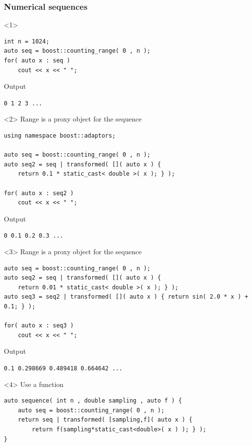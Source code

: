 \documentclass{beamer}
\newcommand{\heading}[1]{\frametitle{#1}}
\begin{document}
\begin{frame}[fragile]
 \heading{Numerical sequences}
 
 \begin{onlyenv}<1>
\begin{lstlisting}[basicstyle=\scriptsize\ttfamily]
int n = 1024;
auto seq = boost::counting_range( 0 , n );
for( auto x : seq )
    cout << x << " ";
\end{lstlisting}
\vspace{2ex}Output

\vspace{0.5ex}\lstinline$0 1 2 3 ...$
 \end{onlyenv}
  \begin{onlyenv}<2>
  Range is a proxy object for the sequence
\begin{lstlisting}[basicstyle=\scriptsize\ttfamily]
using namespace boost::adaptors;

auto seq = boost::counting_range( 0 , n );
auto seq2 = seq | transformed( []( auto x ) {
    return 0.1 * static_cast< double >( x ); } );

for( auto x : seq2 )
    cout << x << " ";
\end{lstlisting}
\vspace{2ex}Output

\vspace{0.5ex}\lstinline$0 0.1 0.2 0.3 ...$
 \end{onlyenv}
  \begin{onlyenv}<3>
  Range is a proxy object for the sequence
\begin{lstlisting}[basicstyle=\scriptsize\ttfamily]
auto seq = boost::counting_range( 0 , n );
auto seq2 = seq | transformed( []( auto x ) {
    return 0.01 * static_cast< double >( x ); } );
auto seq3 = seq2 | transformed( []( auto x ) { return sin( 2.0 * x ) + 0.1; } );

for( auto x : seq3 )
    cout << x << " ";
\end{lstlisting}
\vspace{2ex}Output

\vspace{0.5ex}\lstinline$0.1 0.298669 0.489418 0.664642 ...$
 \end{onlyenv}
  \begin{onlyenv}<4>
Use a function
\begin{lstlisting}[basicstyle=\scriptsize\ttfamily]
auto sequence( int n , double sampling , auto f ) {
    auto seq = boost::counting_range( 0 , n );
    return seq | transformed( [sampling,f]( auto x ) { 
        return f(sampling*static_cast<double>( x ) ); } );
}


\end{lstlisting}
\end{onlyenv}
\end{frame}
\end{document}
